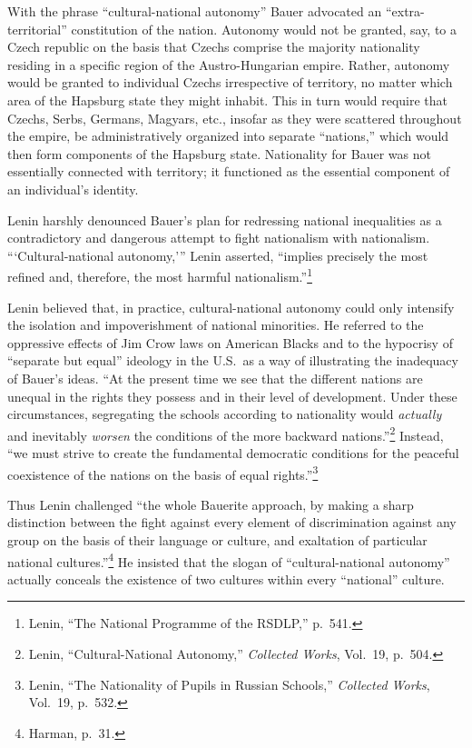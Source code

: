 With the phrase ``cultural-national autonomy'' Bauer advocated an ``extra-territorial'' constitution of the nation. Autonomy would not be granted, say, to a Czech republic on the basis that Czechs comprise the majority nationality residing in a specific region of the Austro-Hungarian empire. Rather, autonomy would be granted to individual Czechs irrespective of territory, no matter which area of the Hapsburg state they might inhabit. This in turn would require that Czechs, Serbs, Germans, Magyars, etc., insofar as they were scattered throughout the empire, be administratively organized into separate ``nations,'' which would then form components of the Hapsburg state. Nationality for Bauer was not essentially connected with territory; it functioned as the essential component of an individual's identity.

Lenin harshly denounced Bauer's plan for redressing national inequalities as a contradictory and dangerous attempt to fight nationalism with nationalism. ```Cultural-national autonomy,''' Lenin asserted, ``implies precisely the most refined and, therefore, the most harmful nationalism.''\footnote{Lenin, ``The National Programme of the RSDLP,'' p.\ 541.}

Lenin believed that, in practice, cultural-national autonomy could only intensify the isolation and impoverishment of national minorities. He referred to the oppressive effects of Jim Crow laws on American Blacks and to the hypocrisy of ``separate but equal'' ideology in the U.S.\ as a way of illustrating the inadequacy of Bauer's ideas. ``At the present time we see that the different nations are unequal in the rights they possess and in their level of development. Under these circumstances, segregating the schools according to nationality would \emph{actually} and inevitably \emph{worsen} the conditions of the more backward nations.''\footnote{Lenin, ``Cultural-National Autonomy,'' \emph{Collected Works}, Vol.\ 19, p.\ 504.} Instead, ``we must strive to create the fundamental democratic conditions for the peaceful coexistence of the nations on the basis of equal rights.''\footnote{Lenin, ``The Nationality of Pupils in Russian Schools,'' \emph{Collected Works}, Vol.\ 19, p.\ 532.}

Thus Lenin challenged ``the whole Bauerite approach, by making a sharp distinction between the fight against every element of discrimination against any group on the basis of their language or culture, and exaltation of particular national cultures.''\footnote{Harman, p.\ 31.} He insisted that the slogan of ``cultural-national autonomy'' actually conceals the existence of two cultures within every ``national'' culture.

